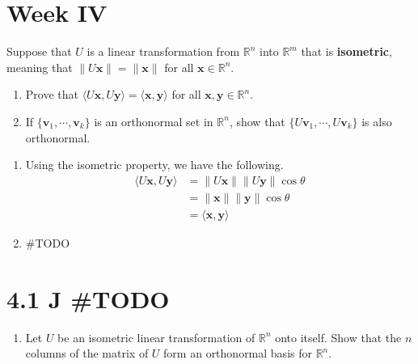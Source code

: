 \documentclass[../main.tex]{subfiles}
\begin{document}
\section{Week IV}

\begin{problem}[\S4.1 I]
    Suppose that $U$ is a linear transformation from $\mathbb{R}^n$ into $\mathbb{R}^m$ that is \textbf{isometric}, meaning that $\|U \mathbf{x}\| = \|\mathbf{x}\|$ for all $\mathbf{x} \in \mathbb{R}^n$.
    \begin{enumerate}[label=(\alph*)]
        \item Prove that $\langle U\mathbf{x}, U \mathbf{y} \rangle = \langle \mathbf{x}, \mathbf{y} \rangle$ for all $\mathbf{x}, \mathbf{y} \in \mathbb{R}^n$.
        \item If $\{ \mathbf{v}_1, \cdots, \mathbf{v}_k \}$ is an orthonormal set in $\mathbb{R}^n$, show that $\{ U \mathbf{v}_1, \cdots, U \mathbf{v}_k \}$ is also orthonormal.
    \end{enumerate}
\end{problem}
\begin{enumerate}[label=(\alph*)]
    \item Using the isometric property, we have the following.
        \begin{align*}
            \langle U\mathbf{x}, U\mathbf{y} \rangle
            &= \|U\mathbf{x}\| \|U\mathbf{y}\| \cos\theta \\
            &= \|\mathbf{x}\| \|\mathbf{y}\| \cos\theta \\
            &= \langle \mathbf{x}, \mathbf{y} \rangle
        \end{align*}
    \item \#TODO
\end{enumerate}

\section{4.1 J \#TODO}
\begin{problem}
    \begin{enumerate}[label=(\alph*)]
        \item Let $U$ be an isometric linear transformation of $\mathbb{R}^n$ onto itself.
            Show that the $n$ columns of the matrix of $U$ form an orthonormal basis for $\mathbb{R}^n$.
    \end{enumerate}
\end{problem}
\end{document}
